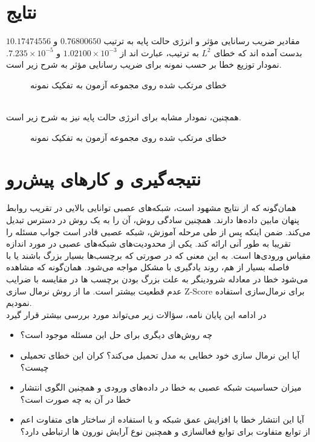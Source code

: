 \section*{نتایج}
مقادیر ضریب رسانایی مؤثر و انرژی حالت پایه به ترتیب $0.76800650$ و $10.17474556$ بدست آمده اند که خطای $L^2$ به ترتیب، عبارت اند از $1.02100 \times 10^{-3}$ و $7.235 \times 10^{-5}$. نمودار توزیع خطا بر حسب نمونه برای ضریب رسانایی مؤثر به شرح زیر است.
\begin{figure}[h!]
	{
		\centering
		\def\svgwidth{\columnwidth}
		\scalebox{.5}{}
		\caption{خطای مرتکب شده  روی مجموعه آزمون به تفکیک نمونه}
		\label{fig:ECIM_error_bar}
	}
\end{figure}
\\همچنین، نمودار مشابه برای انرژی حالت پایه نیز به شرح زیر است.
\begin{figure}[h!]
	{
		\centering
		\def\svgwidth{\columnwidth}
		\scalebox{.5}{}
		\caption{خطای مرتکب شده  روی مجموعه آزمون به تفکیک نمونه}
		\label{fig:NLSE_error_bar}
	}
\end{figure}
\clearpage
\newpage
\section*{نتیجه‌گیری و کارهای پیش‌رو}
همان‌گونه که از نتایج مشهود است، شبکه‌های عصبی توانایی بالایی در تقریب روابط پنهان مابین داده‌ها دارند. همچنین سادگی روش، آن را به یک روش در دسترس تبدیل می‌کند. ضمن اینکه پس از طی مرحله آموزش، شبکه عصبی قادر است جواب مسئله را تقریبا به طور آنی ارائه کند. یکی از محدودیت‌های شبکه‌های عصبی در مورد اندازه مقیاس ورودی‌ها است. به این معنی که در صورتی که برچسب‌ها بسیار بزرگ باشند یا با فاصله بسیار از هم، روند یادگیری با مشکل مواجه می‌شود. همان‌گونه که مشاهده می‌شود خطا در معادله شرودینگر به علت بزرگ بودن برچسب ها در مقایسه با ضرایب عدم قطعیت بیشتر است. ما از روش نرمال سازی Z-Score برای نرمال‌سازی استفاده نمودیم.\\
در ادامه این پایان نامه، سؤالات زیر می‌تواند مورد بررسی بیشتر قرار گیرد
\begin{itemize}
	\item چه روش‌های دیگری برای حل این مسئله موجود است؟
	\item آیا این نرمال سازی خود خطایی به مدل تحمیل می‌کند؟ کران این خطای تحمیلی چیست؟
	\item میزان حساسیت شبکه عصبی به خطا در داده‌های ورودی و همچنین الگوی انتشار خطا در آن به چه صورت است؟
	\item آیا این انتشار خطا با افزایش عمق شبکه و یا استفاده از ساختار های متفاوت اعم از توابع متفاوت برای توابع فعالسازی و همچنین نوع آرایش نورون ها ارتباطی دارد؟
\end{itemize}
\clearpage
\newpage